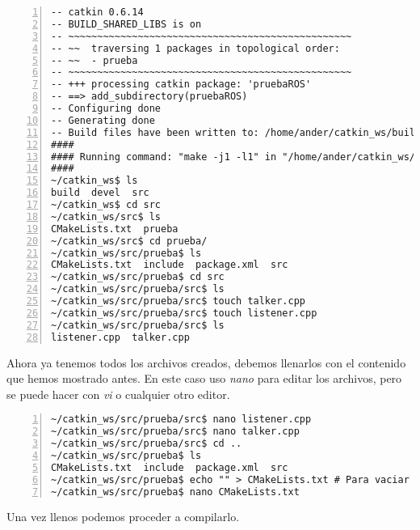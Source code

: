 \begin{lstlisting}[style=consola,numbers=left]
-- catkin 0.6.14
-- BUILD_SHARED_LIBS is on
-- ~~~~~~~~~~~~~~~~~~~~~~~~~~~~~~~~~~~~~~~~~~~~~~~~~
-- ~~  traversing 1 packages in topological order:
-- ~~  - prueba
-- ~~~~~~~~~~~~~~~~~~~~~~~~~~~~~~~~~~~~~~~~~~~~~~~~~
-- +++ processing catkin package: 'pruebaROS'
-- ==> add_subdirectory(pruebaROS)
-- Configuring done
-- Generating done
-- Build files have been written to: /home/ander/catkin_ws/build
####
#### Running command: "make -j1 -l1" in "/home/ander/catkin_ws/build"
####
~/catkin_ws$ ls
build  devel  src
~/catkin_ws$ cd src
~/catkin_ws/src$ ls
CMakeLists.txt  prueba
~/catkin_ws/src$ cd prueba/
~/catkin_ws/src/prueba$ ls
CMakeLists.txt  include  package.xml  src
~/catkin_ws/src/prueba$ cd src
~/catkin_ws/src/prueba/src$ ls
~/catkin_ws/src/prueba/src$ touch talker.cpp
~/catkin_ws/src/prueba/src$ touch listener.cpp
~/catkin_ws/src/prueba/src$ ls
listener.cpp  talker.cpp

	\end{lstlisting}

	Ahora ya tenemos todos los archivos creados, debemos llenarlos con el contenido que hemos mostrado antes. En este caso uso \textit{nano} para editar los archivos, pero se puede hacer con \textit{vi} o cualquier otro editor.

	\begin{lstlisting}[style=consola,numbers=left]
~/catkin_ws/src/prueba/src$ nano listener.cpp
~/catkin_ws/src/prueba/src$ nano talker.cpp
~/catkin_ws/src/prueba/src$ cd ..
~/catkin_ws/src/prueba$ ls
CMakeLists.txt  include  package.xml  src
~/catkin_ws/src/prueba$ echo "" > CMakeLists.txt # Para vaciar el archivo
~/catkin_ws/src/prueba$ nano CMakeLists.txt
	\end{lstlisting}

	Una vez llenos podemos proceder a compilarlo.
	
